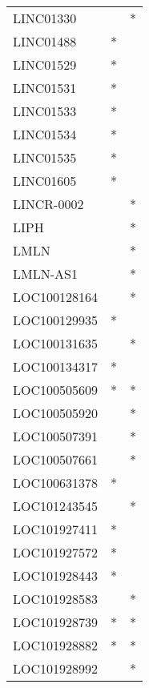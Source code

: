 \begin{longtable}{lcc}
LINC01330        &                &          * \\
LINC01488        &              * &            \\
LINC01529        &              * &            \\
LINC01531        &              * &            \\
LINC01533        &              * &            \\
LINC01534        &              * &            \\
LINC01535        &              * &            \\
LINC01605        &              * &            \\
LINCR-0002       &                &          * \\
LIPH             &                &          * \\
LMLN             &                &          * \\
LMLN-AS1         &                &          * \\
LOC100128164     &                &          * \\
LOC100129935     &              * &            \\
LOC100131635     &                &          * \\
LOC100134317     &              * &            \\
LOC100505609     &              * &          * \\
LOC100505920     &                &          * \\
LOC100507391     &                &          * \\
LOC100507661     &                &          * \\
LOC100631378     &              * &            \\
LOC101243545     &                &          * \\
LOC101927411     &              * &            \\
LOC101927572     &              * &            \\
LOC101928443     &              * &            \\
LOC101928583     &                &          * \\
LOC101928739     &              * &          * \\
LOC101928882     &              * &          * \\
LOC101928992     &                &          * \\

\end{longtable}
